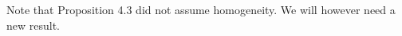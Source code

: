 \documentclass[10pt]{article}
\newtheorem{lemma}[theorem]{Lemma}
\newcommand{\dx}[1][x]{\text{\,d}#1}
\begin{document}
Note that Proposition 4.3 did not assume homogeneity. We will however need a new result.
\end{document}
